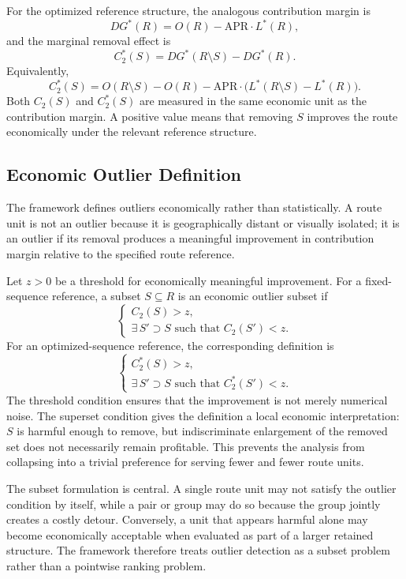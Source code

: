\documentclass[preprint,12pt]{elsarticle}
\begin{document}
For the optimized reference structure, the analogous contribution margin is
\[
DG^*(R)=O(R)-\mathrm{APR}\cdot L^*(R),
\]
and the marginal removal effect is
\[
C_2^*(S)=DG^*(R\setminus S)-DG^*(R).
\]
Equivalently,
\[
C_2^*(S)
=O(R\setminus S)-O(R)
-\mathrm{APR}\cdot\bigl(L^*(R\setminus S)-L^*(R)\bigr).
\]
Both $C_2(S)$ and $C_2^*(S)$ are measured in the same economic unit as the contribution margin. A positive value means that removing $S$ improves the route economically under the relevant reference structure.

\subsection{Economic Outlier Definition}
\label{subsec:economic-outlier-definition}

The framework defines outliers economically rather than statistically. A route unit is not an outlier because it is geographically distant or visually isolated; it is an outlier if its removal produces a meaningful improvement in contribution margin relative to the specified route reference.

Let $z>0$ be a threshold for economically meaningful improvement. For a fixed-sequence reference, a subset $S\subseteq R$ is an economic outlier subset if
\[
\begin{cases}
C_2(S)>z,\\
\exists\, S'\supset S \text{ such that } C_2(S')<z.
\end{cases}
\]
For an optimized-sequence reference, the corresponding definition is
\[
\begin{cases}
C_2^*(S)>z,\\
\exists\, S'\supset S \text{ such that } C_2^*(S')<z.
\end{cases}
\]
The threshold condition ensures that the improvement is not merely numerical noise. The superset condition gives the definition a local economic interpretation: $S$ is harmful enough to remove, but indiscriminate enlargement of the removed set does not necessarily remain profitable. This prevents the analysis from collapsing into a trivial preference for serving fewer and fewer route units.

The subset formulation is central. A single route unit may not satisfy the outlier condition by itself, while a pair or group may do so because the group jointly creates a costly detour. Conversely, a unit that appears harmful alone may become economically acceptable when evaluated as part of a larger retained structure. The framework therefore treats outlier detection as a subset problem rather than a pointwise ranking problem.
\end{document}
